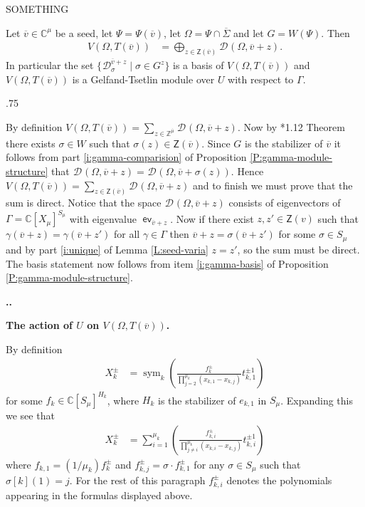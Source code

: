 \documentclass[11pt,fleqn]{amsart}
\makeatletter
\renewcommand\thesection{\arabic{section}}
\renewcommand\proofname{Proof}
\renewenvironment{proof}[1][\textit{\proofname}]{\par
 \pushQED{\qed}%
 \normalfont \topsep.75\paraskip\relax
 \trivlist
 \item[\hskip\labelsep
 \itshape
 #1\@addpunct{.}]\ignorespaces
}{%
 \popQED\endtrivlist\@endpefalse
}
\newcounter{para}[section]
\renewcommand\thepara{\thesection.\arabic{para}}
\def\paragraph{%
 \noindent
 \refstepcounter{para}%
 \textbf{\thepara.}\hspace{1ex}%
}
\newcommand\about[1]{%
 {\bfseries#1.}%
}
\newcommand\CC{\mathbb C}
\newcommand\ZZ{\mathbb Z}
\newcommand\DD[3]{{}^{#1} \mathcal D_{#2}^{#3}}
\newcommand\Z{\mathsf Z}
\newcommand\vv{\overline{v}}
\DeclareMathOperator\sym{sym}
\DeclareMathOperator\ev{\mathsf{ev}}
\makeatother
\begin{document}
SOMETHING

\begin{Proposition}
\label{P:direct-sum}
Let $\vv \in \CC^\mu$ be a seed, let $\Psi = \Psi(\vv)$, let $\Omega = \Psi 
\cap \overline \Sigma$ and let $G = W(\Psi)$. Then
\begin{align*}
V(\Omega, T(\vv))
	&= \bigoplus_{z \in \Z(\vv)} \DD{}{}{}(\Omega, \vv + z).
\end{align*}	
In particular the set $\{\DD{}{\sigma}{\vv + z} \mid \sigma \in G^z\}$
is a basis of $V(\Omega, T(\vv))$ and $V(\Omega, T(\vv))$ is a Gelfand-Tsetlin
module over $U$ with respect to $\Gamma$.
\end{Proposition}
\begin{proof}
By definition $V(\Omega, T(\vv)) = \sum_{z \in \ZZ^{\overline \mu}} 
\DD{}{}{}(\Omega, \vv + z)$. Now by \cite{Hump-coxeter-book}*{1.12 Theorem} 
there exists $\sigma \in W$ such that $\sigma(z) \in \Z(\vv)$. Since
$G$ is the stabilizer of $\vv$ it follows from part \ref{i:gamma-comparision}
of Proposition \ref{P:gamma-module-structure} that $\DD{}{}{}(\Omega, \vv + 
z) = \DD{}{}{}(\Omega, \vv + \sigma(z))$. Hence $V(\Omega, T(\vv)) = 
\sum_{z \in \Z(\vv)} \DD{}{}{}(\Omega, \vv + z)$ and to finish we must prove 
that the sum is direct. Notice that the space $\DD{}{}{}(\Omega, 
\vv + z)$ consists of eigenvectors of $\Gamma = \CC[X_\mu]^{S_\mu}$ with 
eigenvalue $\ev_{\vv + z}$. Now if there exist $z, z' \in \Z(v)$ such that 
$\gamma(\vv + z) = \gamma(\vv + z')$ for all $\gamma \in \Gamma$ then $\vv + z 
= \sigma(\vv + z')$ for some $\sigma \in S_\mu$ and by part \ref{i:unique} of
Lemma \ref{L:seed-varia} $z = z'$, so the sum must be direct. The basis 
statement now follows from item \ref{i:gamma-basis} of Proposition 
\ref{P:gamma-module-structure}.
\end{proof}

\paragraph
\about{The action of $U$ on $V(\Omega, T(\vv))$}
By 
definition
\begin{align*}
X_{k}^\pm 
	&=\sym_k \left(
	\frac{f_k^\pm}
	{\prod_{j = 2}^{\mu_k} (x_{k,1} - x_{k,j})} t_{k,1}^{\pm 1}
\right)
\end{align*}
for some $f_k \in \CC[S_\mu]^{H_k}$, where $H_k$ is the stabilizer of $e_{k,1}$
in $S_\mu$. Expanding this we see that
\begin{align*}
X_{k}^\pm 
	&=\sum_{i=1}^{\mu_k} \left(
	\frac{f_{k,i}^\pm}{\prod_{j \neq i}^{\mu_k} (x_{k,i} - x_{k,j})} 
		t_{k,i}^{\pm 1}
\right)
\end{align*}
where $f_{k,1} = (1/\mu_k) f_k^\pm$ and $f_{k,j}^\pm = \sigma \cdot 
f_{k,1}^\pm$ for any $\sigma \in S_\mu$ such that $\sigma[k](1) = j$. For the 
rest of this paragraph $f_{k,i}^\pm$ denotes the polynomials appearing in the 
formulas displayed above. 
\end{document}
